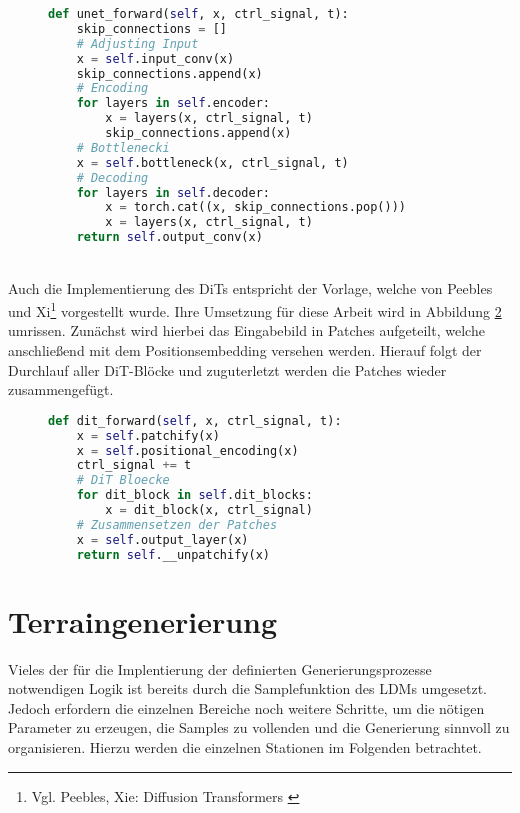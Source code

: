 \begin{figure}[htbp]
\begin{lstlisting}[language=python]
def unet_forward(self, x, ctrl_signal, t):
    skip_connections = []
    # Adjusting Input
    x = self.input_conv(x)
    skip_connections.append(x)
    # Encoding
    for layers in self.encoder:
        x = layers(x, ctrl_signal, t)
        skip_connections.append(x)
    # Bottlenecki
    x = self.bottleneck(x, ctrl_signal, t)
    # Decoding
    for layers in self.decoder:
        x = torch.cat((x, skip_connections.pop())) 
        x = layers(x, ctrl_signal, t)
    return self.output_conv(x)
\end{lstlisting}
    \captionsetup{type=figure}
    \label{fig:UNET_forward}
\end{figure} \\
Auch die Implementierung des \ac{DiT}s entspricht der Vorlage, welche von Peebles und Xi\footnote{
    Vgl. Peebles, Xie: Diffusion Transformers
    \cite{peebles2023scalable}
} vorgestellt wurde. Ihre Umsetzung für diese Arbeit wird in Abbildung \ref{fig:DiT_forward} umrissen. Zunächst wird hierbei das Eingabebild in Patches aufgeteilt, welche anschließend mit dem Positionsembedding versehen werden. Hierauf folgt der Durchlauf aller DiT-Blöcke und zuguterletzt werden die Patches wieder zusammengefügt. 
\begin{figure}[htbp]
\begin{lstlisting}[language=python]
def dit_forward(self, x, ctrl_signal, t):
    x = self.patchify(x)
    x = self.positional_encoding(x)
    ctrl_signal += t
    # DiT Bloecke
    for dit_block in self.dit_blocks:
        x = dit_block(x, ctrl_signal)
    # Zusammensetzen der Patches
    x = self.output_layer(x)
    return self.__unpatchify(x)
\end{lstlisting}
    \captionsetup{type=figure}
    \label{fig:DiT_forward}
\end{figure}

\section {Terraingenerierung}

Vieles der für die Implentierung der definierten Generierungsprozesse notwendigen Logik ist bereits durch die Samplefunktion des \ac{LDM}s umgesetzt. Jedoch erfordern die einzelnen Bereiche noch weitere Schritte, um die nötigen Parameter zu erzeugen, die Samples zu vollenden und die Generierung sinnvoll zu organisieren. Hierzu werden die einzelnen Stationen im Folgenden betrachtet.


